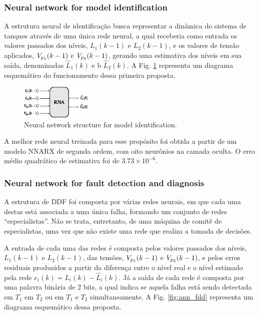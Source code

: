 \documentclass[10pt,fleqn,a4paper]{article}
\begin{document}
\subsubsection{Neural network for model identification}
A estrutura neural de identificação busca representar a dinâmica do sistema de
tanques através de uma única rede neural, a qual receberia como entrada os
valores passados dos níveis, $L_1(k-1)$ e $L_2(k-1)$, e os valores de tensão
aplicados, $V_{p_{\tiny 1}}(k-1)$ e $V_{p_{\tiny 2}}(k-1)$, gerando uma
estimativa dos níveis em sua saída, denominadas $\widehat{L}_1(k)$ e b
$\widehat{L}_2(k)$. A Fig. \ref{fig:ann_id} representa um diagrama esquemático
do funcionamento dessa primeira proposta.

\begin{figure}[htb]
\centering
    \includegraphics[width=0.3\textwidth]{imgs/ann_id}
    \caption{Neural network structure for model identification.}
    \label{fig:ann_id}
\end{figure}

A melhor rede neural treinada para esse propósito foi obtida a partir de um
modelo NNARX de segunda ordem, com oito neurônios na camada oculta. O erro médio
quadrático de estimativa foi de $3.73 \times 10^{-6}$.

\subsubsection{Neural network for fault detection and diagnosis}
A estrutura de DDF foi composta por várias redes neurais, em que cada uma destas
está associada a uma única falha, formando um conjunto de redes
``especialistas''. Não se trata, entretanto, de uma máquina de comitê de
especialistas, uma vez que não existe uma rede que realiza a tomada de decisões.

A entrada de cada uma das redes é composta pelos valores passados dos níveis,
$L_1(k-1)$ e $L_2(k-1)$, das tensões, $V_{p_{\tiny 1}}(k-1)$ e $V_{p_{\tiny
2}}(k-1)$, e pelos erros residuais produzidos a partir da diferença entre o
nível real e o nível estimado pela rede $e_i(k) = L_i(k) - \widehat{L}_i(k)$. Já
a saída de cada rede é composta por uma palavra binária de 2 bits, a qual indica
se aquela falha está sendo detectada em $T_1$ em $T_2$ ou em $T_1$ e $T_2$
simultaneamente. A Fig. \ref{fig:ann_fdd} representa um diagrama esquemático
dessa proposta.
\end{document}
